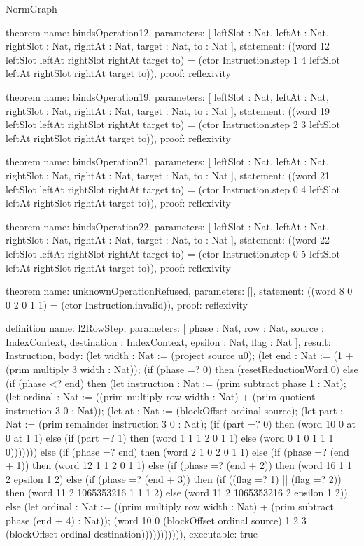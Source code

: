 \begin{lexlean}{NormGraph}
\begin{semanticmodule}
theorem{
  name: bindsOperation12,
  parameters: [
    leftSlot : Nat,
    leftAt : Nat,
    rightSlot : Nat,
    rightAt : Nat,
    target : Nat,
    to : Nat
  ],
  statement: ((word 12 leftSlot leftAt rightSlot rightAt target to) = (ctor Instruction.step 1 4 leftSlot leftAt rightSlot rightAt target to)),
  proof: reflexivity{}
}

theorem{
  name: bindsOperation19,
  parameters: [
    leftSlot : Nat,
    leftAt : Nat,
    rightSlot : Nat,
    rightAt : Nat,
    target : Nat,
    to : Nat
  ],
  statement: ((word 19 leftSlot leftAt rightSlot rightAt target to) = (ctor Instruction.step 2 3 leftSlot leftAt rightSlot rightAt target to)),
  proof: reflexivity{}
}

theorem{
  name: bindsOperation21,
  parameters: [
    leftSlot : Nat,
    leftAt : Nat,
    rightSlot : Nat,
    rightAt : Nat,
    target : Nat,
    to : Nat
  ],
  statement: ((word 21 leftSlot leftAt rightSlot rightAt target to) = (ctor Instruction.step 0 4 leftSlot leftAt rightSlot rightAt target to)),
  proof: reflexivity{}
}

theorem{
  name: bindsOperation22,
  parameters: [
    leftSlot : Nat,
    leftAt : Nat,
    rightSlot : Nat,
    rightAt : Nat,
    target : Nat,
    to : Nat
  ],
  statement: ((word 22 leftSlot leftAt rightSlot rightAt target to) = (ctor Instruction.step 0 5 leftSlot leftAt rightSlot rightAt target to)),
  proof: reflexivity{}
}

theorem{
  name: unknownOperationRefused,
  parameters: [],
  statement: ((word 8 0 0 2 0 1 1) = (ctor Instruction.invalid)),
  proof: reflexivity{}
}

definition{
  name: l2RowStep,
  parameters: [
    phase : Nat,
    row : Nat,
    source : IndexContext,
    destination : IndexContext,
    epsilon : Nat,
    flag : Nat
  ],
  result: Instruction,
  body: (let width : Nat := (project source u0); (let end : Nat := (1 + (prim multiply 3 width : Nat)); (if (phase =? 0) then (resetReductionWord 0) else (if (phase <? end) then (let instruction : Nat := (prim subtract phase 1 : Nat); (let ordinal : Nat := ((prim multiply row width : Nat) + (prim quotient instruction 3 0 : Nat)); (let at : Nat := (blockOffset ordinal source); (let part : Nat := (prim remainder instruction 3 0 : Nat); (if (part =? 0) then (word 10 0 at 0 at 1 1) else (if (part =? 1) then (word 1 1 1 2 0 1 1) else (word 0 1 0 1 1 1 0))))))) else (if (phase =? end) then (word 2 1 0 2 0 1 1) else (if (phase =? (end + 1)) then (word 12 1 1 2 0 1 1) else (if (phase =? (end + 2)) then (word 16 1 1 2 epsilon 1 2) else (if (phase =? (end + 3)) then (if ((flag =? 1) || (flag =? 2)) then (word 11 2 1065353216 1 1 1 2) else (word 11 2 1065353216 2 epsilon 1 2)) else (let ordinal : Nat := ((prim multiply row width : Nat) + (prim subtract phase (end + 4) : Nat)); (word 10 0 (blockOffset ordinal source) 1 2 3 (blockOffset ordinal destination))))))))))),
  executable: true
}


\end{semanticmodule}
\end{lexlean}
